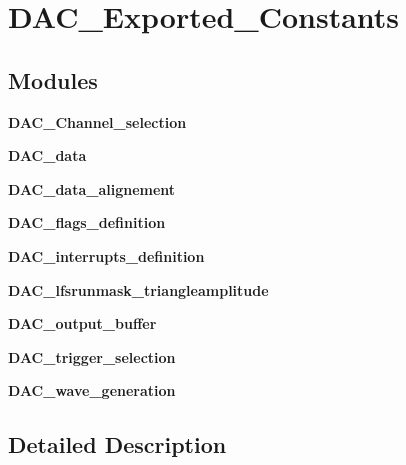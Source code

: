 \section{D\+A\+C\+\_\+\+Exported\+\_\+\+Constants}
\label{group__DAC__Exported__Constants}
\subsection*{Modules}
\begin{DoxyCompactItemize}
\item 
\textbf{ D\+A\+C\+\_\+\+Channel\+\_\+selection}
\item 
\textbf{ D\+A\+C\+\_\+data}
\item 
\textbf{ D\+A\+C\+\_\+data\+\_\+alignement}
\item 
\textbf{ D\+A\+C\+\_\+flags\+\_\+definition}
\item 
\textbf{ D\+A\+C\+\_\+interrupts\+\_\+definition}
\item 
\textbf{ D\+A\+C\+\_\+lfsrunmask\+\_\+triangleamplitude}
\item 
\textbf{ D\+A\+C\+\_\+output\+\_\+buffer}
\item 
\textbf{ D\+A\+C\+\_\+trigger\+\_\+selection}
\item 
\textbf{ D\+A\+C\+\_\+wave\+\_\+generation}
\end{DoxyCompactItemize}


\subsection{Detailed Description}
